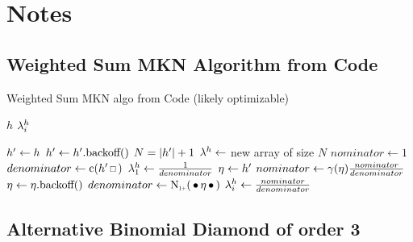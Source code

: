 \chapter{Notes}
\label{ch:notes}


\section{Weighted Sum MKN Algorithm from Code}

\begin{algorithm}
  \caption{Weighted Sum MKN algo from Code (likely optimizable)}
  \begin{algorithmic}[1]
    \Require $h$
    \Ensure $\lambda_i^h$

    \State $h^\prime \gets h$
      \State $h^\prime \gets h^\prime\text{.backoff()}$
    \EndWhile
    \State $N = {\left|h^\prime\right|} + 1$
    \State $\lambda^h \gets$ new array of size $N$
    \State $nominator \gets 1$
    \State $denominator \gets \Count(\SeenHistory \Skp)$
    \State $\lambda_1^h \gets \frac{1}{denominator}$
    \State $\eta \gets h^\prime$
      \State $nominator \gets \gamma(\eta) \frac{nominator}{denominator}$
      \State $\eta \gets \eta\text{.backoff()}$
      \State $denominator \gets \ContCountIp(\WSkp \History \WSkp)$
      \State $\lambda_i^h \gets \frac{nominator}{denominator}$
    \EndFor
  \end{algorithmic}
\end{algorithm}

\clearpage
\section{Alternative Binomial Diamond of order 3}


